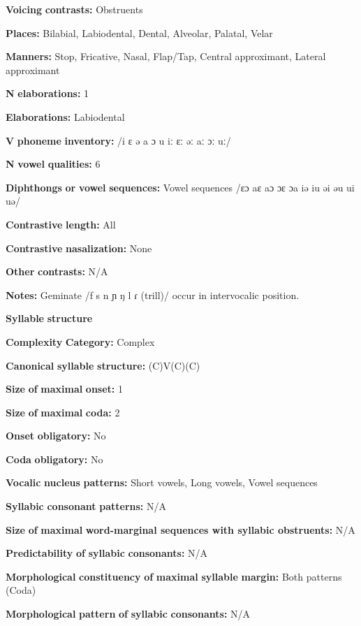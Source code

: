 \textbf{Voicing} \textbf{contrasts:} Obstruents

\textbf{Places:} Bilabial, Labiodental, Dental, Alveolar, Palatal, Velar

\textbf{Manners:} Stop, Fricative, Nasal, Flap/Tap, Central approximant, Lateral approximant

\textbf{N} \textbf{elaborations:} 1

\textbf{Elaborations:} Labiodental

\textbf{V} \textbf{phoneme} \textbf{inventory:} /i ɛ ə a ɔ u iː ɛː əː aː ɔː uː/

\textbf{N} \textbf{vowel} \textbf{qualities:} 6

\textbf{Diphthongs} \textbf{or} \textbf{vowel} \textbf{sequences:} Vowel sequences /ɛɔ aɛ aɔ ɔɛ ɔa iə iu əi əu ui uə/

\textbf{Contrastive} \textbf{length:} All

\textbf{Contrastive} \textbf{nasalization:} None

\textbf{Other} \textbf{contrasts:} N/A

\textbf{Notes:} Geminate /f s n ɲ ŋ l ɾ (trill)/ occur in intervocalic position.

\textbf{Syllable} \textbf{structure}

\textbf{Complexity} \textbf{Category:} Complex

\textbf{Canonical} \textbf{syllable} \textbf{structure:} (C)V(C)(C) \citep[36-43]{Stirtz2011}

\textbf{Size} \textbf{of} \textbf{maximal} \textbf{onset:} 1

\textbf{Size} \textbf{of} \textbf{maximal} \textbf{coda:} 2

\textbf{Onset} \textbf{obligatory:} No

\textbf{Coda} \textbf{obligatory:} No

\textbf{Vocalic} \textbf{nucleus} \textbf{patterns:} Short vowels, Long vowels, Vowel sequences

\textbf{Syllabic} \textbf{consonant} \textbf{patterns:} N/A

\textbf{Size} \textbf{of} \textbf{maximal} \textbf{word{}-marginal sequences with syllabic obstruents:} N/A

\textbf{Predictability} \textbf{of} \textbf{syllabic} \textbf{consonants:} N/A

\textbf{Morphological} \textbf{constituency} \textbf{of} \textbf{maximal} \textbf{syllable} \textbf{margin:} Both patterns (Coda)

\textbf{Morphological} \textbf{pattern} \textbf{of} \textbf{syllabic} \textbf{consonants:} N/A

